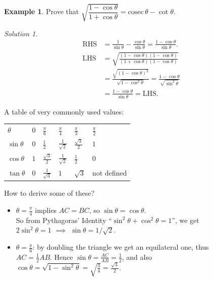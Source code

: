 \documentclass[
  12pt,
  oneside]{book}
\providecommand{\tightlist}{%
  \setlength{\itemsep}{0pt}\setlength{\parskip}{0pt}}
\theoremstyle{definition}
\theoremstyle{definition}
\newtheorem{example}{Example}[chapter]
\theoremstyle{definition}
\theoremstyle{definition}
\theoremstyle{remark}
\newtheorem*{solution}{Solution}
\begin{document}
\begin{example}
Prove that \(\sqrt{\dfrac{1-\cos\theta}{1+\cos\theta}} = \mathrm{cosec}\,\theta-\cot\theta\).
\end{example}

\begin{solution}
\begin{align*}
\mathrm{RHS} &= \frac{1}{\sin\theta}-\frac{\cos\theta}{\sin\theta}= \frac{1-\cos\theta}{\sin\theta}.\\
\mathrm{LHS} &= \sqrt{\frac{(1-\cos\theta)(1-\cos\theta)}{(1+\cos\theta)(1-\cos\theta)}} \\
&= \frac{\sqrt{(1-\cos\theta)^2}}{\sqrt{1-\cos^2\theta}} = \frac{1-\cos\theta}{\sqrt{\sin^2\theta}}\\
&= \frac{1-\cos\theta}{\sin\theta} = \mathrm{LHS}.
\end{align*}
\end{solution}

A table of very commonly used values:

\begin{longtable}[]{@{}
  >{\raggedright\arraybackslash}p{}
  >{\centering\arraybackslash}p{}
  >{\centering\arraybackslash}p{}
  >{\centering\arraybackslash}p{}
  >{\centering\arraybackslash}p{}
  >{\centering\arraybackslash}p{}@{}}
\toprule
\endhead
\(\theta\) & \(0\) & \(\frac{\pi}6\) & \(\frac{\pi}4\) & \(\frac{\pi}3\) & \(\frac{\pi}2\) \\
\(\sin\theta\) & \(0\) & \(\frac12\) & \(\frac1{\sqrt2}\) & \(\frac{\sqrt3}2\) & \(1\) \\
\(\cos\theta\) & \(1\) & \(\frac{\sqrt3}2\) & \(\frac1{\sqrt2}\) & \(\frac12\) & \(0\) \\
\(\tan\theta\) & \(0\) & \(\frac1{\sqrt3}\) & \(1\) & \(\sqrt3\) & not defined \\
\bottomrule
\end{longtable}

How to derive some of these?

\begin{itemize}
\tightlist
\item
  \(\theta=\frac{\pi}4\) implies \(AC=BC\), so \(\sin\theta=\cos\theta\).\\
  So from Pythagoras' Identity ``\(\sin^2\theta+\cos^2\theta=1\)'', we get\\
  \(2\sin^2\theta=1\) \(\implies\) \(\sin\theta=1/\sqrt2\).
\item
  \(\theta=\frac{\pi}{6}\): by doubling the triangle we get an equilateral one, thus\\
  \(AC=\frac12AB\). Hence \(\sin\theta=\frac{AC}{AB}=\frac12\), and also\\
  \(\cos\theta=\sqrt{1-\sin^2\theta} = \sqrt{\frac34} = \frac{\sqrt{3}}2\).
\end{itemize}
\end{document}
